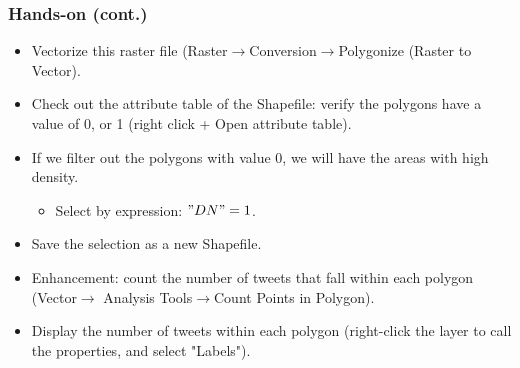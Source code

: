 \documentclass[hyperref={pdfpagelabels=true}]{beamer}
\begin{document}
\begin{frame}
\frametitle{Hands-on (cont.)}
  \begin{itemize}
    \item<1->Vectorize this raster file (Raster$\rightarrow$Conversion$\rightarrow$Polygonize (Raster to Vector).  
    \item<2->Check out the attribute table of the Shapefile: verify the polygons have a value of 0, or 1 (right click + Open attribute table).
    \item<3->If we filter out the polygons with value 0, we will have the areas with high density. 
      \begin{itemize}
	\item<4->Select by expression: $"DN" = 1$. 
      \end{itemize}    
    \item<5->Save the selection as a new Shapefile.
    \item<6->Enhancement: count the number of tweets that fall within each polygon (Vector$\rightarrow$ Analysis Tools$\rightarrow$Count Points in Polygon).
    \item<7->Display the number of tweets within each polygon (right-click the layer to call the properties, and select "Labels").        
  \end{itemize}    
\end{frame}
\end{document}
